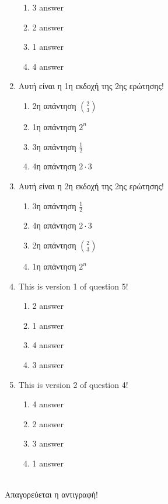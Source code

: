 \documentclass[a4paper, 11pt]{article}
\begin{document}
\begin{enumerate}
\begin{enumerate}[(1)]
    \item 3 answer
    \item 2 answer
    \item 1 answer
    \item 4 answer
\end{enumerate}
\item Αυτή είναι η 1η εκδοχή της 2ης ερώτησης!
\begin{enumerate}[(1)]
    \item 2η απάντηση $\binom{2}{3}$
    \item 1η απάντηση $2^n$
    \item 3η απάντηση $\frac{1}{2}$
    \item 4η απάντηση $2\cdot 3$
\end{enumerate}
\item Αυτή είναι η 2η εκδοχή της 2ης ερώτησης!
\begin{enumerate}[(1)]
    \item 3η απάντηση $\frac{1}{2}$
    \item 4η απάντηση $2\cdot 3$
    \item 2η απάντηση $\binom{2}{3}$
    \item 1η απάντηση $2^n$
\end{enumerate}
\item This is version 1 of question 5!
\begin{enumerate}[(1)]
    \item 2 answer
    \item 1 answer
    \item 4 answer
    \item 3 answer
\end{enumerate}
\item This is version 2 of question 4!
\begin{enumerate}[(1)]
    \item 4 answer
    \item 2 answer
    \item 3 answer
    \item 1 answer
\end{enumerate}
\end{enumerate}
\hrulefill \\ 

Απαγορεύεται η αντιγραφή! 

\newpage 
\end{document}
